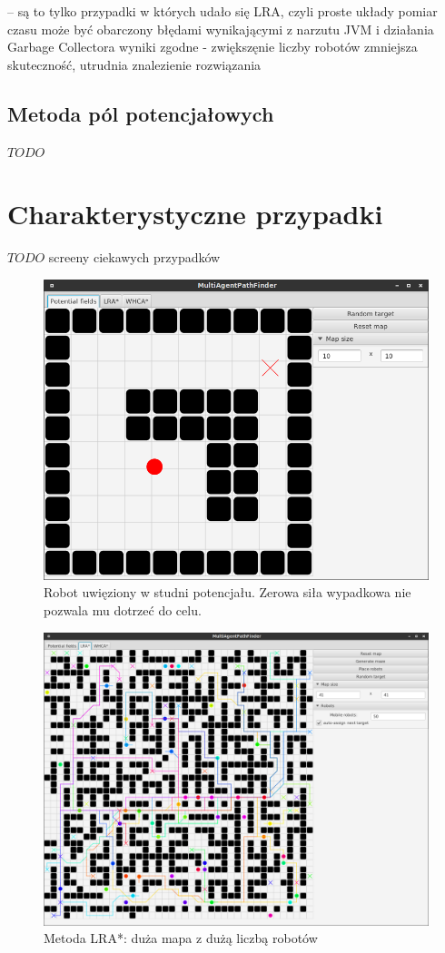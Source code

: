 -- są to tylko przypadki w których udało się LRA, czyli proste układy
pomiar czasu może być obarczony błędami wynikającymi z narzutu JVM i działania Garbage Collectora
wyniki zgodne - zwiększęnie liczby robotów zmniejsza skuteczność, utrudnia znalezienie rozwiązania

\subsection{Metoda pól potencjałowych}
$TODO$

\section{Charakterystyczne przypadki}
$TODO$ screeny ciekawych przypadków

\begin{figure}
	\centering
	\includegraphics[width=0.8\columnwidth]{img/robopath/field-potential-hole}
	\caption{Robot uwięziony w studni potencjału. Zerowa siła wypadkowa nie pozwala mu dotrzeć do celu.}
	\label{fig:test-field-potential-hole}
\end{figure}

\begin{figure}
	\centering
	\includegraphics[width=0.8\columnwidth]{img/robopath/lra-bigmap}
	\caption{Metoda LRA*: duża mapa z dużą liczbą robotów}
	\label{fig:test-lra-bigmap}
\end{figure}

